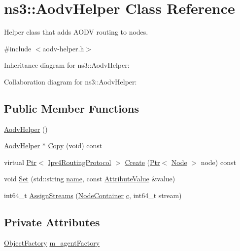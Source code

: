 \hypertarget{classns3_1_1AodvHelper}{}\section{ns3\+:\+:Aodv\+Helper Class Reference}
\label{classns3_1_1AodvHelper}


Helper class that adds A\+O\+DV routing to nodes.  




{\ttfamily \#include $<$aodv-\/helper.\+h$>$}



Inheritance diagram for ns3\+:\+:Aodv\+Helper\+:


Collaboration diagram for ns3\+:\+:Aodv\+Helper\+:
\subsection*{Public Member Functions}
\begin{DoxyCompactItemize}
\item 
\hyperlink{classns3_1_1AodvHelper_a17f148cdfef58e9eb34b801b6b23df79}{Aodv\+Helper} ()
\item 
\hyperlink{classns3_1_1AodvHelper}{Aodv\+Helper} $\ast$ \hyperlink{classns3_1_1AodvHelper_afd466ee08d419ba826ec4b1d1ee91dbd}{Copy} (void) const 
\item 
virtual \hyperlink{classns3_1_1Ptr}{Ptr}$<$ \hyperlink{classns3_1_1Ipv4RoutingProtocol}{Ipv4\+Routing\+Protocol} $>$ \hyperlink{classns3_1_1AodvHelper_a4e588837b00d654debf150b149216b2d}{Create} (\hyperlink{classns3_1_1Ptr}{Ptr}$<$ \hyperlink{classns3_1_1Node}{Node} $>$ node) const 
\item 
void \hyperlink{classns3_1_1AodvHelper_abf26fb7f08adbf3e3d829b1c9b1c86d9}{Set} (std\+::string \hyperlink{generate__test__data__lte__spectrum__model_8m_ab74e6bf80237ddc4109968cedc58c151}{name}, const \hyperlink{classns3_1_1AttributeValue}{Attribute\+Value} \&value)
\item 
int64\+\_\+t \hyperlink{classns3_1_1AodvHelper_a478d356b61ddc4a3384bd50153113f74}{Assign\+Streams} (\hyperlink{classns3_1_1NodeContainer}{Node\+Container} \hyperlink{mmwave_2model_2fading-traces_2fading__trace__generator_8m_ae0323a9039add2978bf5b49550572c7c}{c}, int64\+\_\+t stream)
\end{DoxyCompactItemize}
\subsection*{Private Attributes}
\begin{DoxyCompactItemize}
\item 
\hyperlink{classns3_1_1ObjectFactory}{Object\+Factory} \hyperlink{classns3_1_1AodvHelper_abfdf876d75cce594ac15de780c3fd46c}{m\+\_\+agent\+Factory}
\end{DoxyCompactItemize}

